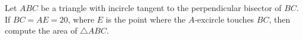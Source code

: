 Let $ABC$ be a triangle with incircle tangent to the perpendicular bisector of $BC$. If $BC=AE=20$, where $E$ is the point where the $A$-excircle touches $BC$, then compute the area of $\triangle{ABC}$.